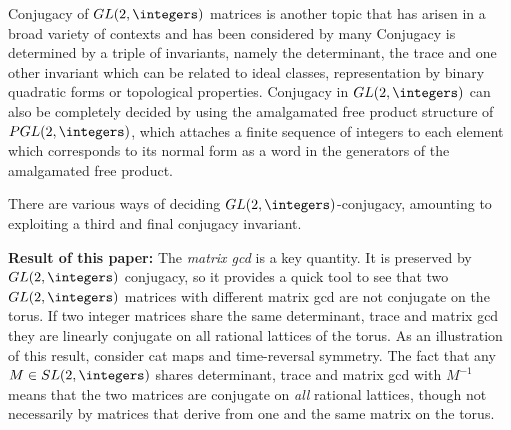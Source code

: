 {Conjugacy of $GL (2,\integers)$
matrices is another topic that has arisen in a broad variety of
contexts and has been considered by many
Conjugacy is determined by a triple of
invariants, namely the determinant, the trace and one other invariant
which can be related to ideal classes, representation by binary
quadratic forms or topological properties. %
Conjugacy in
$GL (2,\integers)$ can also be completely decided by using the amalgamated
free product structure of ${PGL} (2,\integers)$, which attaches a finite
sequence of integers to each element which corresponds to its normal
form as a word in the generators of the amalgamated free product.

There are various ways
of deciding $GL(2,\integers)$-conjugacy, amounting to exploiting a third
and final conjugacy invariant.

{\bf Result of this paper:}
The \emph{matrix gcd} is a key
quantity. It is preserved by $GL (2,\integers)$ conjugacy, so it provides a
quick tool to see that two $GL (2,\integers)$ matrices with different
matrix gcd are not conjugate on the torus.  If two
integer matrices share the same determinant, trace and matrix gcd they
are linearly conjugate on all rational lattices of the torus. As an
illustration of this result, consider
cat maps and time-reversal symmetry. The fact that any $M \in {SL}
(2,\integers)$ shares determinant, trace and matrix gcd with $M^{-1}$ means
that the two matrices are conjugate on \emph{all} rational lattices,
though not necessarily by matrices that derive from one and the same
matrix on the torus.

}
